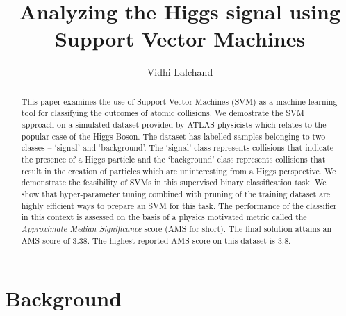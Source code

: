 \documentclass[final,3p,times,twocolumn]{elsarticle}
\begin{document}
\begin{frontmatter}

\title{Analyzing the Higgs signal using Support Vector Machines}
\author{Vidhi Lalchand}
\address{Cavendish Laboratory, Department of Physics, J J Thomson Avenue, Cambridge. CB3 0HE}

\begin{abstract}
This paper examines the use of Support Vector Machines (SVM) as a machine learning tool for classifying the outcomes of atomic collisions. We demostrate the SVM approach on a simulated dataset provided by ATLAS physicists which relates to the popular case of the Higgs Boson. The dataset has labelled samples belonging to two classes -- `signal' and `background'. The `signal' class represents collisions that indicate the presence of a Higgs particle and the `background' class represents collisions that result in the creation of particles which are uninteresting from a Higgs perspective. We demonstrate the feasibility of SVMs in this supervised binary classification task. We show that hyper-parameter tuning combined with pruning of the training dataset are highly efficient ways to prepare an SVM for this task. The performance of the classifier in this context is assessed on the basis of a physics motivated metric called the \textit{Approximate Median Significance} score (AMS for short). The final solution attains an AMS score of 3.38. The highest reported AMS score on this dataset is 3.8.
\end{abstract}
\end{frontmatter}

\section{Background}
\end{document}
